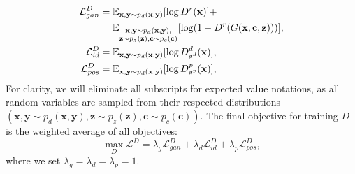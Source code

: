 \documentclass[10pt,journal,compsoc]{IEEEtran}
\begin{document}
\begin{align}
 \mathcal{L}_{gan}^{D}  = {}& \mathbb{E}_{\mathbf{x} ,\mathbf{y} \sim p_{d}(\mathbf{x},\mathbf{y})} [\log D^r({\bf{x}})] + \nonumber \\ 
 {}& \mathbb{E}_{\substack{\mathbf{x} ,\mathbf{y} \sim p_{d}(\mathbf{x},\mathbf{y}), \\ \mathbf{z} \sim p_{z}(\mathbf{z}) , \mathbf{c} \sim p_{c}(\mathbf{c}) }} [\log(1- D^r(G(\mathbf{x}, \mathbf{c}, \mathbf{z}))) ], \\
\mathcal{L}_{id}^{D}  = {} & \mathbb{E}_{\mathbf{x} ,\mathbf{y} \sim p_{d}(\mathbf{x},\mathbf{y})} [\log D^d_{y^d}({\bf{x}})], \\
\mathcal{L}_{pos}^{D}   = {} & \mathbb{E}_{\mathbf{x} ,\mathbf{y} \sim p_{d}(\mathbf{x},\mathbf{y})} [\log D^p_{y^p}({\bf{x}})],
\end{align}%
For clarity, we will eliminate all subscripts for expected value notations, as all random variables are sampled from their respected distributions $(\mathbf{x} ,\mathbf{y} \sim p_{d}(\mathbf{x},\mathbf{y}), \mathbf{z} \sim p_{z}(\mathbf{z}) , \mathbf{c} \sim p_{c}(\mathbf{c}))$. 
The final objective for training $D$ is the weighted average of all objectives:
\begin{equation}
  \max_{D} \mathcal{L}^{D} = \lambda_{g} \mathcal{L}_{gan}^{D} + \lambda_{d} \mathcal{L}_{id}^{D} +\lambda_{p} \mathcal{L}_{pos}^{D},
\label{eqn:objD}
\end{equation}
where we set $\lambda_{g} = \lambda_{d} = \lambda_{p} = 1$.
\end{document}
